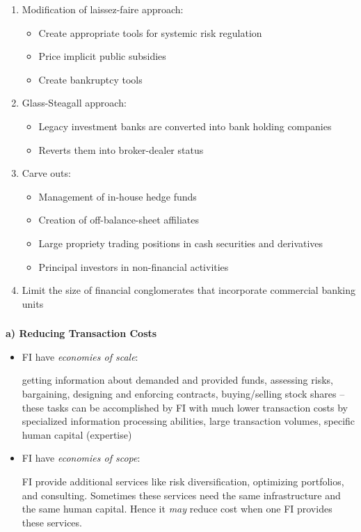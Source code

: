 \documentclass[11pt]{beamer}
\begin{document}

\begin{frame}
\begin{enumerate}
\item Modification of laissez-faire approach:
\begin{itemize}
\item Create appropriate tools for systemic risk regulation
\item Price implicit public subsidies
\item Create bankruptcy tools
\end{itemize}
\vspace{3mm}
\item Glass-Steagall approach:
\begin{itemize}
\item Legacy investment banks are converted into bank holding companies
\item Reverts them into broker-dealer status
\end{itemize}
\vspace{3mm}
\item Carve outs:
\begin{itemize}
\item Management of in-house hedge funds
\item Creation of off-balance-sheet affiliates
\item Large propriety trading positions in cash securities and derivatives
\item Principal investors in non-financial activities
\end{itemize}
\vspace{3mm}

\item Limit the size of financial conglomerates that incorporate commercial banking units
\end{enumerate}
\end{frame}


\begin{frame}
\frametitle{\insertsection}
\textbf{a) Reducing Transaction Costs}
\begin{itemize}
\item FI have \textit{economies of scale}:
\par\smallskip
getting information about demanded and provided funds, assessing risks, bargaining, designing and enforcing contracts, buying/selling stock shares -- these tasks can be accomplished by FI with much lower transaction costs by specialized information processing abilities, large transaction volumes, specific human capital (expertise)
\item FI have \textit{economies of scope}:
\par\smallskip
FI provide additional services like risk diversification, optimizing portfolios, and consulting. Sometimes these services need the same infrastructure and the same human capital. Hence it \textit{may} reduce cost when one FI provides these services.
\end{itemize}
\end{frame}
\end{document}
